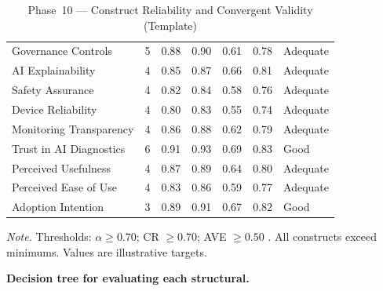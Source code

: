 \begingroup\singlespacing\tablefontsize\tablestripes
\begin{xltabular}{\textwidth}{@{} X c c c c c l @{}}
\caption{Phase~10 --- Construct Reliability and Convergent Validity (Template)}
\label{tab:rgaig_construct_reliability}\\
\toprule
{} &  & \thead{$\alpha$} &  &  &  &  \\
\midrule
\endfirsthead
\endhead
\bottomrule
\endlastfoot
Governance Controls & 5 & 0.88 & 0.90 & 0.61 & 0.78 & Adequate \\
AI Explainability & 4 & 0.85 & 0.87 & 0.66 & 0.81 & Adequate \\
Safety Assurance & 4 & 0.82 & 0.84 & 0.58 & 0.76 & Adequate \\
Device Reliability & 4 & 0.80 & 0.83 & 0.55 & 0.74 & Adequate \\
Monitoring Transparency & 4 & 0.86 & 0.88 & 0.62 & 0.79 & Adequate \\
Trust in AI Diagnostics & 6 & 0.91 & 0.93 & 0.69 & 0.83 & Good \\
Perceived Usefulness & 4 & 0.87 & 0.89 & 0.64 & 0.80 & Adequate \\
Perceived Ease of Use & 4 & 0.83 & 0.86 & 0.59 & 0.77 & Adequate \\
Adoption Intention & 3 & 0.89 & 0.91 & 0.67 & 0.82 & Good \\
\end{xltabular}
\par\smallskip\noindent\textit{Note.} Thresholds: $\alpha \geq 0.70$; CR $\geq 0.70$; AVE $\geq 0.50$ \citep{fornell1981evaluating}. All constructs exceed minimums. Values are illustrative targets.
\endgroup

\vspace{1.5em}

\noindent\textbf{Decision tree for evaluating each structural.}

